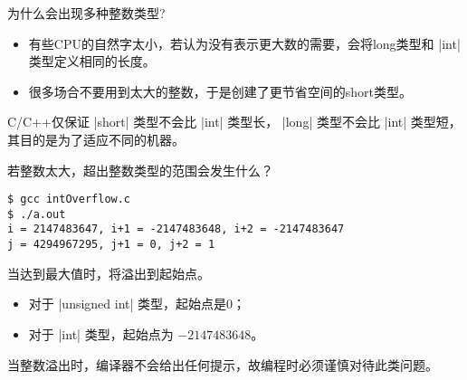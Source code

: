 \begin{frame}[fragile]
  \begin{question}[]{}
    为什么会出现多种整数类型?
  \end{question}
  \pause

  \begin{itemize}
  \item 有些CPU的自然字太小，若认为没有表示更大数的需要，会将long类型和 \lst|int| 类型定义相同的长度。\\[0.1in]
  \item 很多场合不要用到太大的整数，于是创建了更节省空间的short类型。
  \end{itemize}

  \pause 
  \begin{free}[注]{}
    C/C++仅保证 \lst|short| 类型不会比 \lst|int| 类型长，
    \lst|long| 类型不会比 \lst|int| 类型短，其目的是为了适应不同的机器。
  \end{free}

\end{frame}

\begin{frame}[fragile]
\begin{question}[]{}
若整数太大，超出整数类型的范围会发生什么？
\end{question}
\end{frame}

\begin{frame}[fragile]


\begin{lstlisting}[basicstyle=\ttfamily\small]
$ gcc intOverflow.c
$ ./a.out
i = 2147483647, i+1 = -2147483648, i+2 = -2147483647
j = 4294967295, j+1 = 0, j+2 = 1
\end{lstlisting}
\end{frame}
%
\begin{frame}[fragile]

当达到最大值时，将溢出到起始点。\vspace{0.05in}
\begin{itemize}
\item 对于 \lst|unsigned int| 类型，起始点是$0$；\\[0.1in]
\item 对于 \lst|int| 类型，起始点为 $-2147483648$。
\end{itemize}

\pause
\begin{free}[注]{}
  当整数溢出时，编译器不会给出任何提示，故编程时必须谨慎对待此类问题。 
\end{free}


\end{frame}
